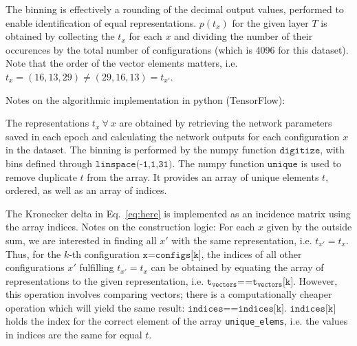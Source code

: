 \documentclass[12pt]{report}
\begin{document}
The binning is effectively a rounding of the decimal output values, performed to enable identification of equal representations. $p(t_x)$ for the given layer $T$ is obtained by collecting the $t_x$ for each $x$ and dividing the number of their occurences by the total number of configurations (which is 4096 for this dataset). Note that the order of the vector elements matters, i.e. $t_x = (16,13,29) \neq (29, 16, 13) = t_{x'}$.

Notes on the algorithmic implementation in python (TensorFlow):

The representations $t_x~\forall~x$ are obtained by retrieving the network parameters saved in each epoch and calculating the network outputs for each configuration $x$ in the dataset. The binning is performed by the numpy function $\texttt{digitize}$, with bins defined through $\texttt{linspace(-1,1,31)}$. The numpy function $\texttt{unique}$ is used to remove duplicate $t$ from the array. It provides an array of unique elements $t$, ordered, as well as an array of indices.


The Kronecker delta in Eq.~\eqref{eq:here} is implemented as an incidence matrix using the array indices. 
Notes on the construction logic: For each $x$ given by the outside sum, we are interested in finding all $x'$ with the same representation, i.e. $t_{x'} = t_x$. Thus, for the $k$-th configuration $\texttt{x=configs[k]}$, the indices of all other configurations $x'$ fulfilling $t_{x'} = t_x$ can be obtained by equating the array of representations to the given representation, i.e. $\texttt{t}_{\texttt{vectors}}\texttt{==t}_{\texttt{vectors}}\texttt{[k]}$. However, this operation involves comparing vectors; there is a computationally cheaper operation which will yield the same result: $\texttt{indices==indices[k]}$.
$\texttt{indices[k]}$ holds the index for the correct element of the array \texttt{unique\_elems}, i.e.
the values in indices are the same for equal $t$.
\end{document}
